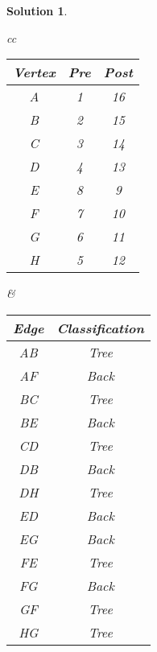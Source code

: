 \documentclass[boxes]{rutgers_hw}
\newtheorem*{solutions}{Solution}
\begin{document}
\begin{solutions}
        \begin{center}
            \begin{tabular}{cc}
                \begin{minipage}{.5\linewidth}
                    \begin{tabular}{|c|c|c|}
                        \hline
                        Vertex & Pre & Post \\
                        \hline
                        A & 1 & 16 \\
                        B & 2 & 15 \\
                        C & 3 & 14 \\
                        D & 4 & 13 \\
                        E & 8 & 9 \\
                        F & 7 & 10 \\
                        G & 6 & 11 \\
                        H & 5 & 12 \\
                        \hline
                    \end{tabular}
                \end{minipage} &
            
                \begin{minipage}{.5\linewidth}
                    \begin{tabular}{|c|c|}
                        \hline
                        Edge & Classification\\
                        \hline
                        AB & Tree \\
                        AF & Back \\
                        BC & Tree \\
                        BE & Back \\
                        CD & Tree \\
                        DB & Back \\
                        DH & Tree \\
                        ED & Back \\
                        EG & Back \\
                        FE & Tree \\
                        FG & Back \\
                        GF & Tree \\
                        HG & Tree \\
                        \hline
                    \end{tabular}
                \end{minipage} 
            \end{tabular}
        \end{center}

    \end{solutions}
\end{document}
